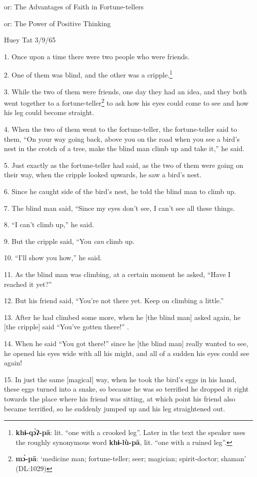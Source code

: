 \setcounter{footnote}{0}

or: The Advantages of Faith in Fortune-tellers

or: The Power of Positive Thinking

Huey Tat 3/9/65

1. Once upon a time there were two people who were friends.

2. One of them was blind, and the other was a cripple.\footnote{\textbf{khɨ-qɔ̀ʔ-pā}: lit. ``one with a crooked leg''. Later in the text the speaker uses the roughly synonymous word \textbf{khɨ-lù-pā}, lit. ``one with a ruined leg''.}

3. While the two of them were friends, one day they had an idea, and they both
went together to a fortune-teller\footnote{\textbf{mɔ́-pā}: `medicine man; fortune-teller; seer; magician; spirit-doctor; shaman' (DL:1029)} to ask how his eyes could come to see and
how his leg could become straight.

4. When the two of them went to the fortune-teller, the fortune-teller said to
them, ``On your way going back, above you on the road when you see a bird's nest
in the crotch of a tree, make the blind man climb up and take it,'' he said.

5. Just exactly as the fortune-teller had said, as the two of them were going on
their way, when the cripple looked upwards, he saw a bird's nest.

6. Since he caught side of the bird's nest, he told the blind man to climb up.

7. The blind man said, ``Since my eyes don't see, I can't see all these things.

8. ``I can't climb up,'' he said.

9. But the cripple said, ``You \textit{can} climb up.

10. ``I'll show you how,'' he said.

11. As the blind man was climbing, at a certain moment he asked, ``Have I reached
it yet?''

12. But his friend said, ``You're not there yet. Keep on climbing a little.''

13. After he had climbed some more, when he [the blind man] asked again, he [the
cripple] said ``You've gotten there!'' .

14. When he said ``You got there!'' since he [the blind man] really wanted to see,
he opened his eyes wide with all his might, and all of a sudden his eyes could
see again!

15. In just the same [magical] way, when he took the bird's eggs in his hand, these
eggs turned into a snake, so because he was so terrified he dropped it right towards
the place where his friend was sitting, at which point his friend also became terrified,
so he suddenly jumped up and his leg straightened out.

